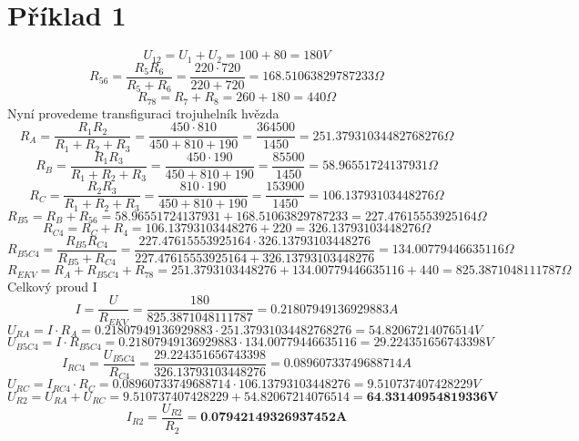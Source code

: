 \section{Příklad 1}
\[
  U_{12} = U_{1} + U_{2} = 100 + 80 = 180V
\]
\[
  R_{56} = \displaystyle\frac{R_{5}R_{6}}{R_{5}+R_{6}}  = \displaystyle\frac{220 \cdot 720}{220 + 720} = 168.51063829787233 \Omega
\]
\[
  R_{78} = R_{7} + R_{8} = 260 + 180 = 440\Omega
\]
Nyní provedeme transfiguraci  trojuhelník hvězda
\[
  R_{A} = \displaystyle\frac{R_{1}R_{2}}{R_{1}+R_{2}+R_{3}}
  = \displaystyle\frac{450 \cdot 810}{450 + 810 + 190}
  = \displaystyle\frac{364500}{1450}
  = 251.37931034482768276 \Omega
\]
\[
  R_{B} = \displaystyle\frac{R_{1}R_{3}}{R_{1}+R_{2}+R_{3}}
  = \displaystyle\frac{450 \cdot 190}{450 + 810 + 190}
  = \displaystyle\frac{85500}{1450}
  = 58.96551724137931 \Omega
\]
\[
  R_{C} = \displaystyle\frac{R_{2}R_{3}}{R_{1}+R_{2}+R_{3}}
  = \displaystyle\frac{810 \cdot 190}{450 + 810 + 190}
  = \displaystyle\frac{153900}{1450}
  = 106.13793103448276 \Omega
\]
\[
  R_{B5} = R_{B} + R_{56} = 58.96551724137931 + 168.51063829787233 = 227.47615553925164 \Omega
\]
\[
  R_{C4} = R_{C} + R_{4} = 106.13793103448276 + 220 = 326.13793103448276 \Omega
\]
\[
  R_{B5C4} = \displaystyle\frac{R_{B5}R_{C4}}{R_{B5}+R_{C4}}
  = \displaystyle\frac{227.47615553925164 \cdot  326.13793103448276}{227.47615553925164 + 326.13793103448276}
  = 134.00779446635116 \Omega
\]
\[
  R_{EKV} = R_{A} + R_{B5C4} + R_{78} = 251.3793103448276 + 134.00779446635116 + 440
  = 825.3871048111787 \Omega
\]
Celkový proud I
\[
  I = \displaystyle\frac{U}{R_{EKV}} = \displaystyle\frac{180}{825.3871048111787} = 0.21807949136929883A
\]
\[
  U_{RA} = I \cdot R_A
  = 0.21807949136929883 \cdot 251.37931034482768276
  = 54.82067214076514V
\]
\[
  U_{B5C4} = I \cdot R_{B5C4}
 = 0.21807949136929883 \cdot 134.00779446635116
 = 29.224351656743398V
\]
\[
  I_{RC4} = \displaystyle\frac{U_{B5C4}}{R_{C4}} 
 = \displaystyle\frac{29.224351656743398}{326.13793103448276}
 = 0.08960733749688714 A
\] 
\[
  U_{RC} = I_{RC4} \cdot R_C
  = 0.08960733749688714  \cdot 106.13793103448276
  = 9.510737407428229 V
\]
\[
  U_{R2} = U_{RA} + U_{RC}
  = 9.510737407428229+54.82067214076514
  = \textbf{64.33140954819336V}
\]
\[
  I_{R2} = \displaystyle\frac{U_{R2}}{R_2}
  = \textbf{0.07942149326937452A}
\]

